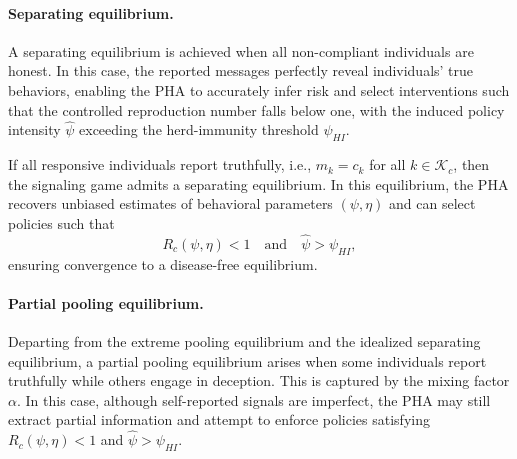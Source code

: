 \documentclass[sigconf,review]{acmart}
\begin{document}

\paragraph{Separating equilibrium.}


A separating equilibrium \cite{BergstromRS2002} is achieved when all non-compliant individuals are honest. In this case, the reported messages perfectly reveal individuals’ true behaviors, enabling the PHA to accurately infer risk and select interventions such that the controlled reproduction number falls below one, with the induced policy intensity $\widehat{\psi}$ exceeding the herd-immunity threshold $\psi_{HI}$.

\begin{theorem}
\label{thm:separating}
If all responsive individuals report truthfully, i.e., $m_k = c_k$ for all $k\in\mathcal{K}_c$, then the signaling game admits a separating equilibrium. In this equilibrium, the PHA recovers unbiased estimates of behavioral parameters $(\psi,\eta)$ and can select policies such that
\[
R_c(\psi,\eta) < 1 \quad \text{and} \quad \widehat{\psi} > \psi_{HI},
\]
ensuring convergence to a disease-free equilibrium.
\end{theorem}


\paragraph{Partial pooling equilibrium.}
Departing from the extreme pooling equilibrium and the idealized separating equilibrium, a partial pooling equilibrium arises when some individuals report truthfully while others engage in deception. This is captured by the mixing factor $\alpha$. In this case, although self-reported signals are imperfect, the PHA may still extract partial information and attempt to enforce policies satisfying $R_c(\psi,\eta) < 1$ and $\widehat{\psi} > \psi_{HI}$.
\end{document}
